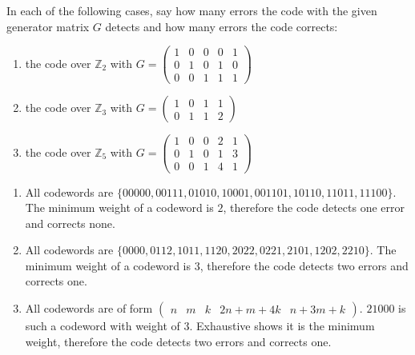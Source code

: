\begin{exercise}
    In each of the following cases, say how many errors the code with the given generator matrix \(G\) detects and how many errors the code corrects:
    \begin{enumerate}
        \item the code over \(\mathbb{Z}_2\) with \(G = \begin{pmatrix}
                  1 & 0 & 0 & 0 & 1 \\
                  0 & 1 & 0 & 1 & 0 \\
                  0 & 0 & 1 & 1 & 1
              \end{pmatrix}\)
        \item the code over \(\mathbb{Z}_3\) with \(G = \begin{pmatrix}
                  1 & 0 & 1 & 1 \\
                  0 & 1 & 1 & 2
              \end{pmatrix}\)
        \item the code over \(\mathbb{Z}_5\) with \(G = \begin{pmatrix}
                  1 & 0 & 0 & 2 & 1 \\
                  0 & 1 & 0 & 1 & 3 \\
                  0 & 0 & 1 & 4 & 1
              \end{pmatrix}\)
    \end{enumerate}
\end{exercise}
\begin{solution}\itemfix
    \begin{enumerate}
        \item All codewords are \(\{00000, 00111, 01010, 10001, 001101, 10110, 11011, 11100\}\). The minimum weight of a codeword is \(2\), therefore the code detects one error and corrects none.
        \item All codewords are \(\{0000, 0112, 1011, 1120, 2022, 0221, 2101, 1202, 2210\}\). The minimum weight of a codeword is \(3\), therefore the code detects two errors and corrects one.
        \item All codewords are of form \(\begin{pmatrix} n & m & k & 2n + m + 4k & n + 3m + k \end{pmatrix}\). \(21000\) is such a codeword with weight of \(3\). Exhaustive shows it is the minimum weight, therefore the code detects two errors and corrects one.
    \end{enumerate}
\end{solution}

